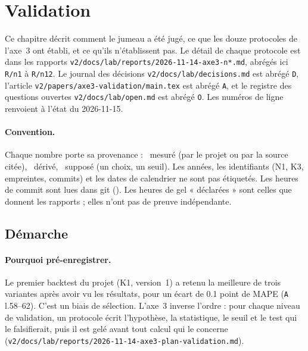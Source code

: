 \section{Validation}\label{sec:validation-ref}\label{val:sec}
\begingroup\setlength{\emergencystretch}{3em}%

Ce chapitre décrit comment le jumeau a été jugé, ce que les douze protocoles de l'axe~3 ont
établi, et ce qu'ils n'établissent pas. Le détail de chaque protocole est dans les rapports
\texttt{v2/docs/lab/reports/2026-11-14-axe3-n*.md}, abrégés ici \texttt{R/n1} à \texttt{R/n12}.
Le journal des décisions \texttt{v2/docs/lab/decisions.md} est abrégé \texttt{D}, l'article
\texttt{v2/papers/axe3-validation/main.tex} est abrégé \texttt{A}, et le registre des questions
ouvertes \texttt{v2/docs/lab/open.md} est abrégé \texttt{O}. Les numéros de ligne renvoient à
l'état du 2026-11-15.

\paragraph{Convention.} Chaque nombre porte sa provenance : \mesure{}~mesuré (par le projet ou
par la source citée), \derive{}~dérivé, \suppose{}~supposé (un choix, un seuil). Les années, les
identifiants (N1, K3, empreintes, commits) et les dates de calendrier ne sont pas étiquetés. Les
heures de commit sont lues dans git (\mesure). Les heures de gel « déclarées » sont celles que
donnent les rapports ; elles n'ont pas de preuve indépendante.

\subsection{Démarche}\label{val:demarche}

\paragraph{Pourquoi pré-enregistrer.} Le premier backtest du projet (K1, version~1) a retenu la
meilleure de trois variantes après avoir vu les résultats, pour un écart de \num{0.1}\mesure{}
point de MAPE (\texttt{A} l.58--62). C'est un biais de sélection. L'axe~3 inverse l'ordre : pour
chaque niveau de validation, un protocole écrit l'hypothèse, la statistique, le seuil et le test
qui le falsifierait, puis il est gelé avant tout calcul qui le concerne
(\texttt{v2/docs/lab/reports/2026-11-14-axe3-plan-validation.md}).

